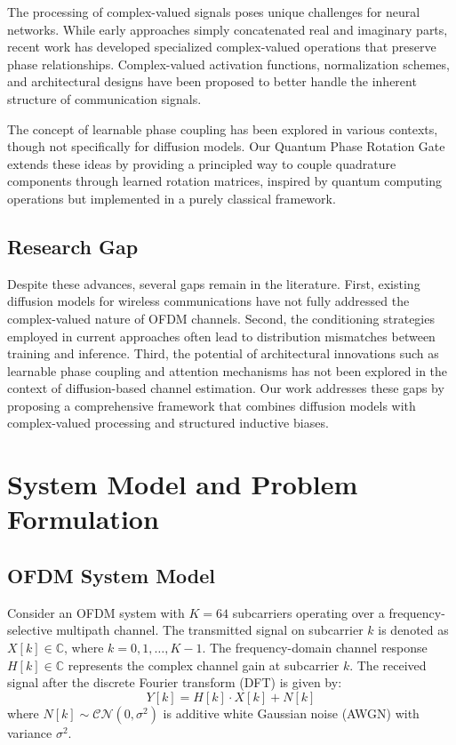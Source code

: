 \documentclass[conference]{IEEEtran}
\begin{document}
The processing of complex-valued signals poses unique challenges for neural networks. While early approaches simply concatenated real and imaginary parts, recent work has developed specialized complex-valued operations that preserve phase relationships. Complex-valued activation functions, normalization schemes, and architectural designs have been proposed to better handle the inherent structure of communication signals.

The concept of learnable phase coupling has been explored in various contexts, though not specifically for diffusion models. Our Quantum Phase Rotation Gate extends these ideas by providing a principled way to couple quadrature components through learned rotation matrices, inspired by quantum computing operations but implemented in a purely classical framework.

\subsection{Research Gap}

Despite these advances, several gaps remain in the literature. First, existing diffusion models for wireless communications have not fully addressed the complex-valued nature of OFDM channels. Second, the conditioning strategies employed in current approaches often lead to distribution mismatches between training and inference. Third, the potential of architectural innovations such as learnable phase coupling and attention mechanisms has not been explored in the context of diffusion-based channel estimation. Our work addresses these gaps by proposing a comprehensive framework that combines diffusion models with complex-valued processing and structured inductive biases.

\section{System Model and Problem Formulation}

\subsection{OFDM System Model}

Consider an OFDM system with $K = 64$ subcarriers operating over a frequency-selective multipath channel. The transmitted signal on subcarrier $k$ is denoted as $X[k] \in \mathbb{C}$, where $k = 0, 1, \ldots, K-1$. The frequency-domain channel response $H[k] \in \mathbb{C}$ represents the complex channel gain at subcarrier $k$. The received signal after the discrete Fourier transform (DFT) is given by:
\begin{equation}
Y[k] = H[k] \cdot X[k] + N[k]
\end{equation}
where $N[k] \sim \mathcal{CN}(0, \sigma^2)$ is additive white Gaussian noise (AWGN) with variance $\sigma^2$.
\end{document}
